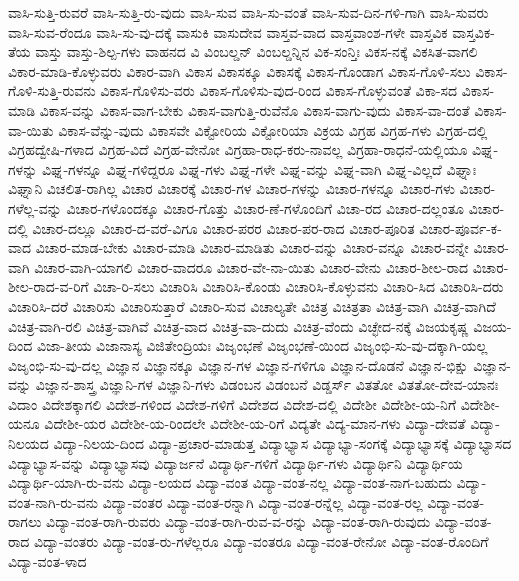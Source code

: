 {ವಾಸಿ-ಸುತ್ತಿ-ರುವರೆ
ವಾಸಿ-ಸುತ್ತಿ-ರು-ವುದು
ವಾಸಿ-ಸುವ
ವಾಸಿ-ಸು-ವಂತೆ
ವಾಸಿ-ಸುವ-ದಿನ-ಗಳಿ-ಗಾಗಿ
ವಾಸಿ-ಸುವರು
ವಾಸಿ-ಸುವ-ರೆಂದೂ
ವಾಸಿ-ಸು-ವು-ದಕ್ಕೆ
ವಾಸುಕಿ
ವಾಸುದೇವ
ವಾಸ್ತವ-ವಾದ
ವಾಸ್ತವಾಂಶ-ಗಳೇ
ವಾಸ್ತವಿಕ
ವಾಸ್ತವಿಕ-ತೆಯ
ವಾಸ್ತು
ವಾಸ್ತು-ಶಿಲ್ಪ-ಗಳು
ವಾಹನದ
ವಿ
ವಿಂಬಲ್ಡನ್
ವಿಂಬಲ್ಡನ್ನಿನ
ವಿಕ-ಸಂನ್ತಿಃ
ವಿಕಸ-ನಕ್ಕೆ
ವಿಕಸಿತ-ವಾಗಲಿ
ವಿಕಾರ-ಮಾಡಿ-ಕೊಳ್ಳುವರು
ವಿಕಾರ-ವಾಗಿ
ವಿಕಾಸ
ವಿಕಾಸಕ್ಕೂ
ವಿಕಾಸಕ್ಕೆ
ವಿಕಾಸ-ಗೊಂಡಾಗ
ವಿಕಾಸ-ಗೊಳಿ-ಸಲು
ವಿಕಾಸ-ಗೊಳಿ-ಸುತ್ತಿ-ರುವನು
ವಿಕಾಸ-ಗೊಳಿಸು-ವರು
ವಿಕಾಸ-ಗೊಳಿಸು-ವುದ-ರಿಂದ
ವಿಕಾಸ-ಗೊಳ್ಳುವಂತೆ
ವಿಕಾ-ಸದ
ವಿಕಾಸ-ಮಾಡಿ
ವಿಕಾಸ-ವನ್ನು
ವಿಕಾಸ-ವಾಗ-ಬೇಕು
ವಿಕಾಸ-ವಾಗುತ್ತಿ-ರುವೆನೊ
ವಿಕಾಸ-ವಾಗು-ವುದು
ವಿಕಾಸ-ವಾ-ದಂತೆ
ವಿಕಾಸ-ವಾ-ಯಿತು
ವಿಕಾಸ-ವೆನ್ನು-ವುದು
ವಿಕಾಸವೇ
ವಿಕ್ಟೋರಿಯ
ವಿಕ್ಟೋರಿಯಾ
ವಿಕ್ರಯ
ವಿಗ್ರಹ
ವಿಗ್ರಹ-ಗಳು
ವಿಗ್ರಹ-ದಲ್ಲಿ
ವಿಗ್ರಹದ್ವೇಷಿ-ಗಳಾದ
ವಿಗ್ರಹ-ವಿದೆ
ವಿಗ್ರಹ-ವೇನೋ
ವಿಗ್ರಹಾ-ರಾಧ-ಕರು-ನಾವಲ್ಲ
ವಿಗ್ರಹಾ-ರಾಧನೆ-ಯಲ್ಲಿಯೂ
ವಿಘ್ನ-ಗಳನ್ನು
ವಿಘ್ನ-ಗಳನ್ನೂ
ವಿಘ್ನ-ಗಳಿದ್ದರೂ
ವಿಘ್ನ-ಗಳು
ವಿಘ್ನ-ಗಳೇ
ವಿಘ್ನ-ವನ್ನು
ವಿಘ್ನ-ವಾಗಿ
ವಿಘ್ನ-ವಿಲ್ಲದೆ
ವಿಘ್ನಾಃ
ವಿಘ್ನಾನಿ
ವಿಚಲಿತ-ರಾಗಿಲ್ಲ
ವಿಚಾರ
ವಿಚಾರಕ್ಕೆ
ವಿಚಾರ-ಗಳ
ವಿಚಾರ-ಗಳನ್ನು
ವಿಚಾರ-ಗಳನ್ನೂ
ವಿಚಾರ-ಗಳು
ವಿಚಾರ-ಗಳೆಲ್ಲ-ವನ್ನು
ವಿಚಾರ-ಗಳೊಂದಕ್ಕೂ
ವಿಚಾರ-ಗೊತ್ತು
ವಿಚಾರ-ಣೆ-ಗಳೊಂದಿಗೆ
ವಿಚಾ-ರದ
ವಿಚಾರ-ದಲ್ಲಂತೂ
ವಿಚಾರ-ದಲ್ಲಿ
ವಿಚಾರ-ದಲ್ಲೂ
ವಿಚಾರ-ದ-ವರೆ-ವಿಗೂ
ವಿಚಾರ-ಪರರ
ವಿಚಾರ-ಪರ-ರಾದ
ವಿಚಾರ-ಪೂರಿತ
ವಿಚಾರ-ಪೂರ್ವ-ಕ-ವಾದ
ವಿಚಾರ-ಮಾಡ-ಬೇಕು
ವಿಚಾರ-ಮಾಡಿ
ವಿಚಾರ-ಮಾಡಿತು
ವಿಚಾರ-ವನ್ನು
ವಿಚಾರ-ವನ್ನೂ
ವಿಚಾರ-ವನ್ನೇ
ವಿಚಾರ-ವಾಗಿ
ವಿಚಾರ-ವಾಗಿ-ಯಾಗಲಿ
ವಿಚಾರ-ವಾದರೂ
ವಿಚಾರ-ವೇ-ನಾ-ಯಿತು
ವಿಚಾರ-ವೇನು
ವಿಚಾರ-ಶೀಲ-ರಾದ
ವಿಚಾರ-ಶೀಲ-ರಾದ-ವ-ರಿಗೆ
ವಿಚಾ-ರಿ-ಸಲು
ವಿಚಾರಿಸಿ
ವಿಚಾರಿಸಿ-ಕೊಂಡು
ವಿಚಾರಿಸಿ-ಕೊಳ್ಳುವನು
ವಿಚಾರಿ-ಸಿದ
ವಿಚಾರಿಸಿ-ದರು
ವಿಚಾರಿಸಿ-ದರೆ
ವಿಚಾರಿಸು
ವಿಚಾರಿಸುತ್ತಾರೆ
ವಿಚಾರಿ-ಸುವ
ವಿಚಾಲ್ಯತೇ
ವಿಚಿತ್ರ
ವಿಚಿತ್ರತಾ
ವಿಚಿತ್ರ-ವಾಗಿ
ವಿಚಿತ್ರ-ವಾಗಿದೆ
ವಿಚಿತ್ರ-ವಾಗಿ-ರಲಿ
ವಿಚಿತ್ರ-ವಾಗಿವೆ
ವಿಚಿತ್ರ-ವಾದ
ವಿಚಿತ್ರ-ವಾ-ದುದು
ವಿಚಿತ್ರ-ವೆಂದು
ವಿಚ್ಛೇದ-ನಕ್ಕೆ
ವಿಜಯಕೃಷ್ಣ
ವಿಜಯ-ದಿಂದ
ವಿಜಾ-ತೀಯ
ವಿಜಾನಾಸ್ಯ
ವಿಜಿತೇಂದ್ರಿಯಃ
ವಿಜೃಂಭಣೆ
ವಿಜೃಂಭಣೆ-ಯಿಂದ
ವಿಜೃಂಭಿ-ಸು-ವು-ದಕ್ಕಾಗಿ-ಯಲ್ಲ
ವಿಜೃಂಭಿ-ಸು-ವು-ದಲ್ಲ
ವಿಜ್ಞಾನ
ವಿಜ್ಞಾನಕ್ಕೂ
ವಿಜ್ಞಾನ-ಗಳ
ವಿಜ್ಞಾನ-ಗಳಿಗೂ
ವಿಜ್ಞಾನ-ದೊಡನೆ
ವಿಜ್ಞಾನ-ಭಿಕ್ಷು
ವಿಜ್ಞಾನ-ವನ್ನು
ವಿಜ್ಞಾನ-ಶಾಸ್ತ್ರ
ವಿಜ್ಞಾನಿ-ಗಳ
ವಿಜ್ಞಾನಿ-ಗಳು
ವಿಡಂಬನ
ವಿಡಂಬನೆ
ವಿಡ್ಡರ್ಸ್
ವಿತತೋ
ವಿತತೋ-ದೇವ-ಯಾನಃ
ವಿದಾಂ
ವಿದೇಶಕ್ಕಾಗಲಿ
ವಿದೇಶ-ಗಳಿಂದ
ವಿದೇಶ-ಗಳಿಗೆ
ವಿದೇಶದ
ವಿದೇಶ-ದಲ್ಲಿ
ವಿದೇಶೀ
ವಿದೇಶೀ-ಯ-ನಿಗೆ
ವಿದೇಶೀ-ಯನೂ
ವಿದೇಶೀ-ಯರ
ವಿದೇಶೀ-ಯ-ರಿಂದಲೇ
ವಿದೇಶೀ-ಯ-ರಿಗೆ
ವಿದ್ಯತೇ
ವಿದ್ಯ-ಮಾನ-ಗಳು
ವಿದ್ಯಾ-ದೇವತೆ
ವಿದ್ಯಾ-ನಿಲಯದ
ವಿದ್ಯಾ-ನಿಲಯ-ದಿಂದ
ವಿದ್ಯಾ-ಪ್ರಚಾರ-ಮಾಡುತ್ತ
ವಿದ್ಯಾಭ್ಯಾಸ
ವಿದ್ಯಾಭ್ಯಾ-ಸಂಗಕ್ಕೆ
ವಿದ್ಯಾಭ್ಯಾಸಕ್ಕೆ
ವಿದ್ಯಾಭ್ಯಾಸದ
ವಿದ್ಯಾಭ್ಯಾಸ-ವನ್ನು
ವಿದ್ಯಾಭ್ಯಾಸವು
ವಿದ್ಯಾರ್ಜನೆ
ವಿದ್ಯಾರ್ಥಿ-ಗಳಿಗೆ
ವಿದ್ಯಾರ್ಥಿ-ಗಳು
ವಿದ್ಯಾರ್ಥಿನಿ
ವಿದ್ಯಾರ್ಥಿಯ
ವಿದ್ಯಾರ್ಥಿ-ಯಾಗಿ-ರು-ವನು
ವಿದ್ಯಾ-ಲಯದ
ವಿದ್ಯಾ-ವಂತ
ವಿದ್ಯಾ-ವಂತ-ನಲ್ಲ
ವಿದ್ಯಾ-ವಂತ-ನಾಗ-ಬಹುದು
ವಿದ್ಯಾ-ವಂತ-ನಾಗಿ-ರು-ವನು
ವಿದ್ಯಾ-ವಂತರ
ವಿದ್ಯಾ-ವಂತ-ರನ್ನಾಗಿ
ವಿದ್ಯಾ-ವಂತ-ರನ್ನೆಲ್ಲ
ವಿದ್ಯಾ-ವಂತ-ರಲ್ಲ
ವಿದ್ಯಾ-ವಂತ-ರಾಗಲು
ವಿದ್ಯಾ-ವಂತ-ರಾಗಿ-ರುವರು
ವಿದ್ಯಾ-ವಂತ-ರಾಗಿ-ರುವ-ವ-ರನ್ನು
ವಿದ್ಯಾ-ವಂತ-ರಾಗಿ-ರುವುದು
ವಿದ್ಯಾ-ವಂತ-ರಾದ
ವಿದ್ಯಾ-ವಂತರು
ವಿದ್ಯಾ-ವಂತ-ರು-ಗಳೆಲ್ಲರೂ
ವಿದ್ಯಾ-ವಂತರೂ
ವಿದ್ಯಾ-ವಂತ-ರೇನೋ
ವಿದ್ಯಾ-ವಂತ-ರೊಂದಿಗೆ
ವಿದ್ಯಾ-ವಂತ-ಳಾದ
}
